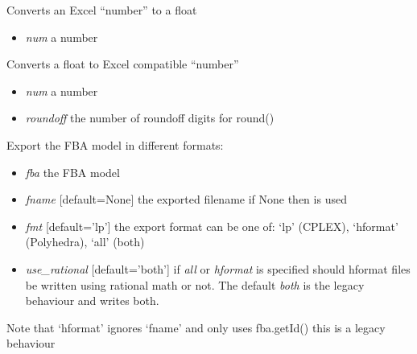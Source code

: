 \documentclass[a4paper,11pt,english]{sphinxmanual}
\begin{document}

\begin{fulllineitems}
\label{modules_doc:cbmpy.CBWrite.convertExcelToFloat}
Converts an Excel ``number'' to a float
\begin{itemize}
\item {} 
\emph{num} a number

\end{itemize}

\end{fulllineitems}


\begin{fulllineitems}
\label{modules_doc:cbmpy.CBWrite.convertFloatToExcel}
Converts a float to Excel compatible ``number''
\begin{itemize}
\item {} 
\emph{num} a number

\item {} 
\emph{roundoff} the number of roundoff digits for round()

\end{itemize}

\end{fulllineitems}


\begin{fulllineitems}
\label{modules_doc:cbmpy.CBWrite.exportModel}
Export the FBA model in different formats:
\begin{itemize}
\item {} 
\emph{fba} the FBA model

\item {} 
\emph{fname} {[}default=None{]} the exported filename if None then  is used

\item {} 
\emph{fmt} {[}default='lp'{]} the export format can be one of: `lp' (CPLEX), `hformat' (Polyhedra), `all' (both)

\item {} 
\emph{use\_rational} {[}default='both'{]} if \emph{all} or \emph{hformat} is specified should hformat files be written using rational math or not. The default \emph{both} is the legacy behaviour and writes both.

\end{itemize}

Note that `hformat' ignores `fname' and only uses fba.getId() this is a legacy behaviour

\end{fulllineitems}
\end{document}
